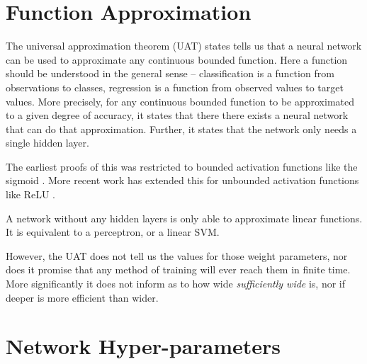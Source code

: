 \documentclass[12pt,parskip]{komatufte}\right
\begin{document}





\section{Function Approximation}

The universal approximation theorem (UAT) states tells us that a neural network can be used to approximate any continuous bounded function.
Here a function should be understood in the general sense -- classification is a function from observations to classes, regression is a function from observed values to target values.
More precisely, for any continuous bounded function to be approximated to a given degree of accuracy,
it states that there there exists a neural network that can do that approximation.
Further, it states that the network only needs a single hidden layer.

The earliest proofs of this was restricted to bounded activation functions like the sigmoid  \pcite{}.
More recent work has extended this for unbounded activation functions like ReLU .

A network without any hidden layers is only able to approximate linear functions.
It is equivalent to a perceptron, or a linear SVM. 


However, the UAT does not tell us the values for those weight parameters,
nor does it promise that any method of training will ever reach them in finite time.
More significantly it does not inform as to how wide \emph{sufficiently wide} is,
nor if deeper is more efficient than wider.


\section{Network Hyper-parameters}
\end{document}
